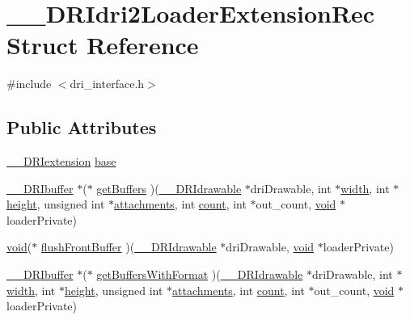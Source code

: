 \hypertarget{struct_____d_r_idri2_loader_extension_rec}{}\section{\+\_\+\+\_\+\+D\+R\+Idri2\+Loader\+Extension\+Rec Struct Reference}
\label{struct_____d_r_idri2_loader_extension_rec}


{\ttfamily \#include $<$dri\+\_\+interface.\+h$>$}

\subsection*{Public Attributes}
\begin{DoxyCompactItemize}
\item 
\hyperlink{dri__interface_8h_a4e0a61c8ece00d2b2c6792a9a1b55385}{\+\_\+\+\_\+\+D\+R\+Iextension} \hyperlink{struct_____d_r_idri2_loader_extension_rec_a017db553ff9b672e344aca9f6846711e}{base}
\item 
\hyperlink{dri__interface_8h_a99ccb036a4865817ec4d06d153ba2446}{\+\_\+\+\_\+\+D\+R\+Ibuffer} $\ast$($\ast$ \hyperlink{struct_____d_r_idri2_loader_extension_rec_a9f030fcd471a25644439feb5e963e35a}{get\+Buffers} )(\hyperlink{dri__interface_8h_a5bfb832a0a08208d95b3bbef439d2262}{\+\_\+\+\_\+\+D\+R\+Idrawable} $\ast$dri\+Drawable, int $\ast$\hyperlink{gl_8h_a9a82cf3caff84cabc4598e2619faac17}{width}, int $\ast$\hyperlink{gl_8h_aa352f2804b9902ac30769c00dde75d5f}{height}, unsigned int $\ast$\hyperlink{glcorearb_8h_ab1774e5671b09a9cc14614868cc6a9b9}{attachments}, int \hyperlink{gl_8h_a619bc20e8198de3bd3f3d7fc34de66b2}{count}, int $\ast$out\+\_\+count, \hyperlink{_s_d_l__opengles2__gl2ext_8h_ae5d8fa23ad07c48bb609509eae494c95}{void} $\ast$loader\+Private)
\item 
\hyperlink{_s_d_l__opengles2__gl2ext_8h_ae5d8fa23ad07c48bb609509eae494c95}{void}($\ast$ \hyperlink{struct_____d_r_idri2_loader_extension_rec_a40e4f92207897e6c0d8ebd3dafe2a807}{flush\+Front\+Buffer} )(\hyperlink{dri__interface_8h_a5bfb832a0a08208d95b3bbef439d2262}{\+\_\+\+\_\+\+D\+R\+Idrawable} $\ast$dri\+Drawable, \hyperlink{_s_d_l__opengles2__gl2ext_8h_ae5d8fa23ad07c48bb609509eae494c95}{void} $\ast$loader\+Private)
\item 
\hyperlink{dri__interface_8h_a99ccb036a4865817ec4d06d153ba2446}{\+\_\+\+\_\+\+D\+R\+Ibuffer} $\ast$($\ast$ \hyperlink{struct_____d_r_idri2_loader_extension_rec_ad26fa15ad8b8c73ccfb87e9c9a085ca0}{get\+Buffers\+With\+Format} )(\hyperlink{dri__interface_8h_a5bfb832a0a08208d95b3bbef439d2262}{\+\_\+\+\_\+\+D\+R\+Idrawable} $\ast$dri\+Drawable, int $\ast$\hyperlink{gl_8h_a9a82cf3caff84cabc4598e2619faac17}{width}, int $\ast$\hyperlink{gl_8h_aa352f2804b9902ac30769c00dde75d5f}{height}, unsigned int $\ast$\hyperlink{glcorearb_8h_ab1774e5671b09a9cc14614868cc6a9b9}{attachments}, int \hyperlink{gl_8h_a619bc20e8198de3bd3f3d7fc34de66b2}{count}, int $\ast$out\+\_\+count, \hyperlink{_s_d_l__opengles2__gl2ext_8h_ae5d8fa23ad07c48bb609509eae494c95}{void} $\ast$loader\+Private)
\end{DoxyCompactItemize}


